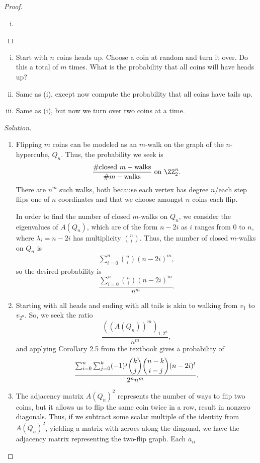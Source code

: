 \documentclass[11pt]{scrartcl}
\begin{document}
\begin{proof}
    \begin{enumerate}[(i)]
        \item 
    \end{enumerate}
\end{proof}
\begin{problem}
\phantom{0}
\begin{enumerate}[(i)]
    \item Start with $n$ coins heads up. Choose a coin at random and turn it over. Do this a total of $m$ times. What is the probability that all coins will have heads up?
    \item Same as (i), except now compute the probability that all coins have tails up.
    \item Same as (i), but now we turn over two coins at a time.
\end{enumerate}
\end{problem}
\begin{proof}[Solution]
    \phantom{0}
\begin{enumerate}[(i.)]
    \item Flipping $m$ coins can be modeled as an $m$-walk on the graph of the $n$-hypercube, $Q_n$. Thus, the probability we seek is \[\frac{\#\text{closed }m-\text{walks}}{\#m-\text{walks}}\text{ on }\ZZ_2^n.\] There are $n^m$ such walks, both because each vertex has degree $n$/each step flips one of $n$ coordinates and that we choose amongst $n$ coins each flip. 
    
    In order to find the number of closed $m$-walks on $Q_n$, we consider the eigenvalues of $A(Q_n)$, which are of the form $n-2i$ as $i$ ranges from $0$ to $n$, where $\lambda_i=n-2i$ has multiplicity $\binom{n}{i}$. Thus, the number of closed $m$-walks on $Q_n$ is
    \begin{align*}
        \sum_{i = 0}^{n} \binom{n}{i} (n-2i)^m,
    \end{align*}
    so the desired probability is \[\dfrac{\sum_{i = 0}^{n} \binom{n}{i} (n-2i)^m}{n^m}.\]

    \item Starting with all heads and ending with all tails is akin to walking from $v_1$ to $v_{2^n}$. So, we seek the ratio \[\frac{((A(Q_n))^m)_{1,2^n}}{n^m},\] and applying Corollary 2.5 from the textbook gives a probability of \[\frac{\sum_{i=0}^n\sum_{j=0}^k(-1)^j\dbinom{k}{j}\dbinom{n-k}{i-j}(n-2i)^l}{2^nn^m}.\]
    \item The adjacency matrix $A(Q_n)^2$ represents the number of ways to flip two coins, but it allows us to flip the same coin twice in a row, result in nonzero diagonals. Thus, if we subtract some scalar multiple of the identity from $A(Q_n)^2$, yielding a matrix with zeroes along the diagonal, we have the adjacency matrix representing the two-flip graph. Each $a_{ii}$ 
\end{enumerate}
\end{proof}
\end{document}
